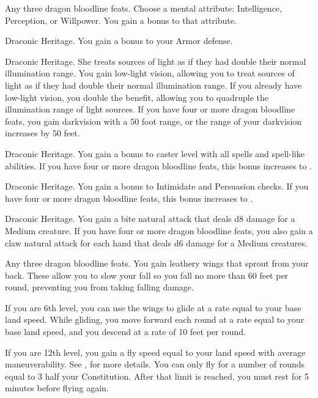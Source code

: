 \featpre Any three dragon bloodline feats.
\featben Choose a mental attribute: Intelligence, Perception, or Willpower.
You gain a  bonus to that attribute.

\featpre Draconic Heritage.
\featben You gain a  bonus to your Armor defense.

\featpre Draconic Heritage.
She treats sources of light as if they had double their normal illumination range.
\featben You gain low-light vision, allowing you to treat sources of light as if they had double their normal illumination range.
If you already have low-light vision, you double the benefit, allowing you to quadruple the illumination range of light sources.
If you have four or more dragon bloodline feats, you gain darkvision with a 50 foot range, or the range of your darkvision increases by 50 feet.

\featpre Draconic Heritage.
\featben You gain a  bonus to caster level with all spells and spell-like abilities.
If you have four or more dragon bloodline feats, this bonus increases to .

\featpre Draconic Heritage.
\featben You gain a  bonus to Intimidate and Persuasion checks.
If you have four or more dragon bloodline feats, this bonus increases to .

\featpre Draconic Heritage.
\featben You gain a bite natural attack that deals d8 damage for a Medium creature.
If you have four or more dragon bloodline feats, you also gain a claw natural attack for each hand that deals d6 damage for a Medium creatures.

\featpre Any three dragon bloodline feats.
\featben You gain leathery wings that sprout from your back.
These allow you to slow your fall so you fall no more than 60 feet per round, preventing you from taking falling damage.

If you are 6th level, you can use the wings to glide at a rate equal to your base land speed.
While gliding, you move forward each round at a rate equal to your base land speed, and you descend at a rate of 10 feet per round.

If you are 12th level, you gain a fly speed equal to your land speed with average maneuverability.
See , for more details.
You can only fly for a number of rounds equal to 3 \add half your Constitution.
After that limit is reached, you must rest for 5 minutes before flying again.

